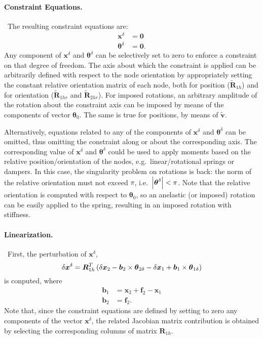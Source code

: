 \documentclass[10pt,dvips,fleqn,subeqn]{report}
\newcommand{\T}[1]{\boldsymbol{#1}}
\begin{document}
\paragraph{Constraint Equations.} \
The resulting constraint equations are:
\begin{align}
	\T{x}^{\delta} &= \T{0}
	\label{TOTAL-JOINT:constraint-x} \\
	\T{\theta}^{\delta} &= \T{0} .
	\label{TOTAL-JOINT:constraint-theta}
\end{align}
Any component of $\T{x}^{\delta}$ and $\T{\theta}^{\delta}$
can be selectively set to zero to enforce a constraint
on that degree of freedom.
The axis about which the constraint is applied can be arbitrarily 
defined with respect to the node orientation
by appropriately setting the constant relative orientation
matrix of each node, both for position ($\tilde{\T{R}}_{1h}$) 
and for orientation ($\tilde{\T{R}}_{1hr}$ and $\tilde{\T{R}}_{2hr}$).
For imposed rotations, an arbitrary amplitude of the rotation about 
the constraint axis can be imposed by means of the components 
of vector $\T{\theta}_0$.
The same is true for positions, by means of $\tilde{\T{v}}$. 

Alternatively, equations related to any of the components
of $\T{x}^{\delta}$ and $\T{\theta}^{\delta}$ can be omitted,
thus omitting the constraint along or about the corresponding axis.
The corresponding value of  $\T{x}^{\delta}$ and $\T{\theta}^{\delta}$ 
could be used to apply moments based on the relative position/orientation 
of the nodes, e.g.\ linear/rotational springs or dampers.
In this case, the singularity problem on rotations is back: the norm
of the relative orientation must not exceed $\pi$, i.e.\
$\shbr{\T{\theta}^{\delta}}<\pi$.
Note that the relative orientation is computed with respect to 
$\T{\theta}_0$, so an anelastic (or imposed) rotation can be easily
applied to the spring, resulting in an imposed rotation with stiffness.

\paragraph{Linearization.} \
First, the perturbation of $\T{x}^{\delta}$,
\begin{equation}
	\delta \T{x}^{\delta} = 
	\T{R}_{1h}^T\plbr{
		\delta\T{x}_2 - \T{b}_2 \times \T{\theta}_{2\delta}
		- \delta\T{x}_1 + \T{b}_1 \times \T{\theta}_{1\delta}
	}
\end{equation}
is conputed, where
\begin{align}
	\T{b}_1 &= \T{x}_2 + \T{f}_2 - \T{x}_1 \\
	\T{b}_2 &= \T{f}_2 .
\end{align}
Note that, since the constraint equations are defined by setting 
to zero any components of the vector $\T{x}^{\delta}$, the
related Jacobian matrix contribution is obtained by selecting 
the corresponding columns of matrix $\T{R}_{1h}$.
\end{document}
